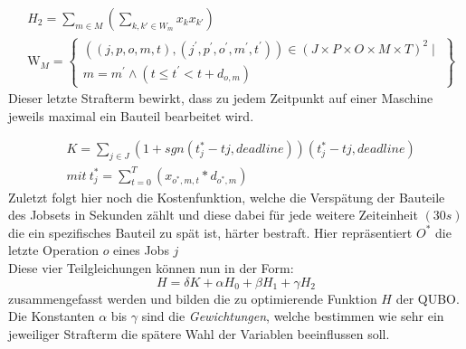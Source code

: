\begin{align}
&H_{2} = \sum_{m\in M} (\sum_{k, k'\in W_{m}} x_{k}x_{k'})\\
&\mathrm{W}_{M}=\left\{\begin{array}{c}
\left((j, p, o, m, t),\left(j^{\prime}, p^{\prime}, o^{\prime}, m^{\prime}, t^{\prime}\right)\right) \in(J \times P \times O \times M \times T)^{2} \mid \\
m=m^{\prime} \wedge\left(t \leq t^{\prime}<t+d_{o, m}\right)
\end{array} \right\}
\label{H2}
\end{align}
Dieser letzte Strafterm bewirkt, dass zu jedem Zeitpunkt auf einer Maschine jeweils maximal ein Bauteil bearbeitet wird\cite{Denkena2021}.

\begin{align}
&K = \sum_{j\in J} (1 + sgn(t_{j}^{*} - t{j,deadline}))(t_{j}^{*} - t{j,deadline})\\
&mit\: t_{j}^{*} = \sum_{t=0}^{T}(x_{o^{*},m,t} * d_{o^{*},m})
\label{K}
\end{align}
Zuletzt folgt hier noch die Kostenfunktion, welche die Verspätung der Bauteile des Jobsets in Sekunden zählt und diese dabei für jede weitere Zeiteinheit $(30s)$ die ein spezifisches Bauteil zu spät ist, härter bestraft\cite{Kurowski2020}. Hier repräsentiert $O^{*}$ die letzte Operation $o$ eines Jobs $j$\\
Diese vier Teilgleichungen können nun in der Form:
\begin{equation}
H = \delta K + \alpha H_{0} + \beta H_{1} + \gamma H_{2}
\label{HGesamt}
\end{equation}
zusammengefasst werden und bilden die zu optimierende Funktion $H$ der QUBO.
Die Konstanten $\alpha$ bis $\gamma$ sind die \textit{Gewichtungen}, welche bestimmen wie sehr ein jeweiliger Strafterm die spätere Wahl der Variablen beeinflussen soll.

